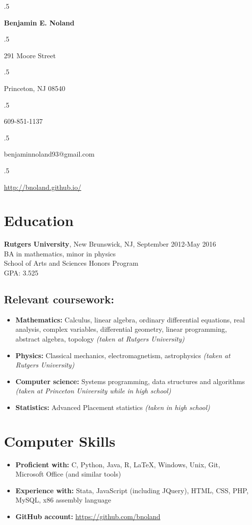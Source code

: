 \documentclass[12pt]{article}
\begin{document}
\moveleft.5\hoffset\centerline{\Large\bf Benjamin E. Noland}
\smallskip
\moveleft.5\hoffset\centerline{291 Moore Street}
\moveleft.5\hoffset\centerline{Princeton, NJ 08540}
\moveleft.5\hoffset\centerline{609-851-1137}
\moveleft.5\hoffset\centerline{benjaminnoland93@gmail.com}
\moveleft.5\hoffset\centerline{\url{http://bnoland.github.io/}}

\section*{Education}

\textbf{Rutgers University}, New Brunswick, NJ, September 2012-May 2016 \\
BA in mathematics, minor in physics \\
School of Arts and Sciences Honors Program \\
GPA: 3.525

\subsection*{Relevant coursework:}
\begin{itemize}
\item
\textbf{Mathematics:} Calculus, linear algebra, ordinary differential equations, real analysis, complex variables, differential geometry, linear programming, abstract algebra, topology \textit{(taken at Rutgers University)}

\item
\textbf{Physics:}
Classical mechanics, electromagnetism, astrophysics \textit{(taken at Rutgers University)}

\item
\textbf{Computer science:}
Systems programming, data structures and algorithms \textit{(taken at Princeton University while in high school)}

\item
\textbf{Statistics:} Advanced Placement statistics \textit{(taken in high school)}

\end{itemize}

\section*{Computer Skills}
\begin{itemize}
\item
\textbf{Proficient with:} C, Python, Java, R, \LaTeX, Windows, Unix, Git, Microsoft Office (and similar tools)
\item
\textbf{Experience with:} Stata, JavaScript (including JQuery), HTML, CSS, PHP, MySQL, x86 assembly language
\item
\textbf{GitHub account:} \url{https://github.com/bnoland}
\end{itemize}
\end{document}
